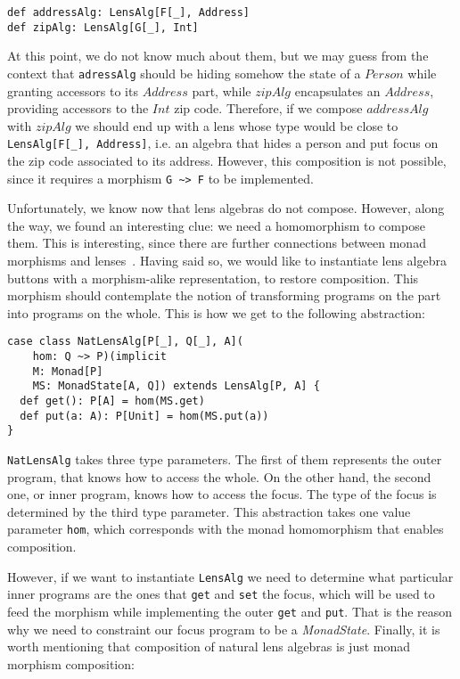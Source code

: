 \documentclass[final, twocolumn, 3p]{elsarticle}
\begin{document}
\begin{lstlisting}
def addressAlg: LensAlg[F[_], Address]
def zipAlg: LensAlg[G[_], Int]
\end{lstlisting}

At this point, we do not know much about them, but we may guess from the context
that \lstinline{adressAlg} should be hiding somehow the state of a $Person$
while granting accessors to its $Address$ part, while $zipAlg$ encapsulates an
$Address$, providing accessors to the $Int$ zip code. Therefore, if we compose
$addressAlg$ with $zipAlg$ we should end up with a lens whose type would be
close to \lstinline{LensAlg[F[_], Address]}, i.e. an algebra that hides a person
and put focus on the zip code associated to its address. However, this
composition is not possible, since it requires a morphism \lstinline{G ~> F} to
be implemented.

Unfortunately, we know now that lens algebras do not compose. However, along the
way, we found an interesting clue: we need a homomorphism to compose them. This
is interesting, since there are further connections between monad morphisms and
lenses~\cite{abou2015notions}. Having said so, we would like to instantiate lens
algebra buttons with a morphism-alike representation, to restore composition.
This morphism should contemplate the notion of transforming programs on the part
into programs on the whole. This is how we get to the following abstraction:

\begin{lstlisting}
case class NatLensAlg[P[_], Q[_], A](
    hom: Q ~> P)(implicit
    M: Monad[P]
    MS: MonadState[A, Q]) extends LensAlg[P, A] {
  def get(): P[A] = hom(MS.get)
  def put(a: A): P[Unit] = hom(MS.put(a))
}
\end{lstlisting}

\lstinline{NatLensAlg} takes three type parameters. The first of them represents
the outer program, that knows how to access the whole. On the other hand, the
second one, or inner program, knows how to access the focus. The type of the
focus is determined by the third type parameter. This abstraction takes one
value parameter \lstinline{hom}, which corresponds with the monad homomorphism
that enables composition.

However, if we want to instantiate \lstinline{LensAlg} we need to determine
what particular inner programs are the ones that \lstinline{get} and
\lstinline{set} the focus, which will be used to feed the morphism while
implementing the outer \lstinline{get} and \lstinline{put}. That is the reason
why we need to constraint our focus program to be a \emph{MonadState}. Finally,
it is worth mentioning that composition of natural lens algebras is just monad
morphism composition:
\end{document}
